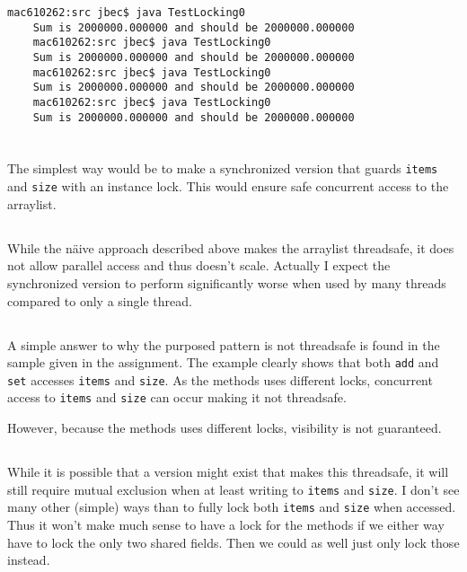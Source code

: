 \documentclass{ituhandin}
\begin{document}
\begin{lstlisting}[language={}, frame={}]
    mac610262:src jbec$ java TestLocking0
    Sum is 2000000.000000 and should be 2000000.000000
    mac610262:src jbec$ java TestLocking0
    Sum is 2000000.000000 and should be 2000000.000000
    mac610262:src jbec$ java TestLocking0
    Sum is 2000000.000000 and should be 2000000.000000
    mac610262:src jbec$ java TestLocking0
    Sum is 2000000.000000 and should be 2000000.000000
\end{lstlisting}

\chapter{} %
\section{}
The simplest way would be to make a synchronized version that guards \texttt{items} and \texttt{size} with an instance lock. This would ensure safe concurrent access to the arraylist.
\section{}\label{sec:lock}
While the näive approach described above makes the arraylist threadsafe, it does not allow parallel access and thus doesn't scale. Actually I expect the synchronized version to perform significantly worse when used by many threads compared to only a single thread.
\section{}
A simple answer to why the purposed pattern is not threadsafe is found in the sample given in the assignment. The example clearly shows that both \texttt{add} and \texttt{set} accesses \texttt{items} and \texttt{size}. As the methods uses different locks, concurrent access to \texttt{items} and \texttt{size} can occur making it not threadsafe.


However, because the methods uses different locks, visibility is not guaranteed.
\section{}
While it is possible that a version might exist that makes this threadsafe, it will still require mutual exclusion when at least writing to \texttt{items} and \texttt{size}. I don't see many other (simple) ways than to fully lock both \texttt{items} and \texttt{size} when accessed. Thus it won't make much sense to have a lock for the methods if we either way have to lock the only two shared fields. Then we could as well just only lock those instead.
\end{document}
